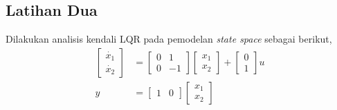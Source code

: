 \documentclass[../main.tex]{subfiles}
\begin{document}
        \subsection{Latihan Dua}
            Dilakukan analisis kendali LQR pada pemodelan \textit{state space} sebagai berikut,
            \begin{equation}
                \begin{split}
                    \begin{bmatrix}\dot{x_1} \\ \dot{x_2} \end{bmatrix} &= \begin{bmatrix} 0 & 1 \\ 0 & -1 \end{bmatrix} \begin{bmatrix} x_1 \\ x_2 \end{bmatrix} + \begin{bmatrix}0 \\ 1\end{bmatrix}u \\[5pt]
                y &= \begin{bmatrix} 1 & 0 \end{bmatrix} \begin{bmatrix} x_1 \\ x_2 \end{bmatrix}
                \label{persamaan_10}
                \end{split}
            \end{equation}
\end{document}
